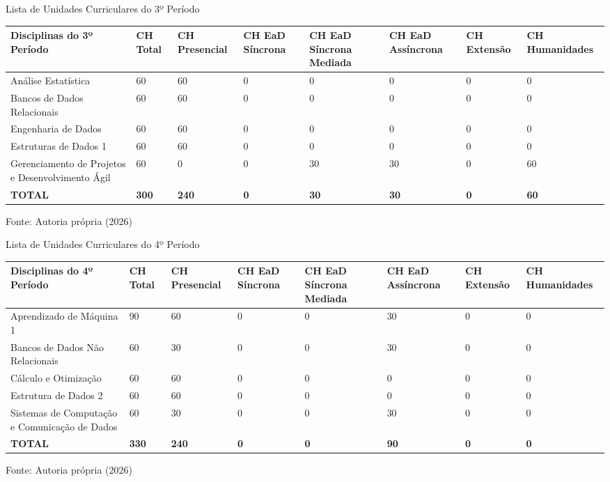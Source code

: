 \begin{quadro}[ht!]
\centering
\caption{Lista de Unidades Curriculares do 3º Período}
\label{quadro2.3}
\small
\begin{tabular}{|p{4.2cm}|p{1.2cm}|p{1.2cm}|p{1.2cm}|p{1.2cm}|p{1.2cm}|p{1.2cm}|p{1.2cm}|}
\hline
\rowcolor{gray!10} \textbf{Disciplinas do 3º Período} & \textbf{CH Total} & \textbf{CH Presencial} & \textbf{CH EaD Síncrona} & \textbf{CH EaD Síncrona Mediada} & \textbf{CH EaD Assíncrona} & \textbf{CH Extensão} & \textbf{CH Humanidades} \\ \hline
Análise Estatística & 60 & 60 & 0 & 0 & 0 & 0 & 0 \\ \hline
Bancos de Dados Relacionais & 60 & 60 & 0 & 0 & 0 & 0 & 0 \\ \hline
Engenharia de Dados & 60 & 60 & 0 & 0 & 0 & 0 & 0 \\ \hline
Estruturas de Dados 1 & 60 & 60 & 0 & 0 & 0 & 0 & 0 \\ \hline
Gerenciamento de Projetos e Desenvolvimento Ágil & 60 & 0 & 0 & 30 & 30 & 0 & 60 \\ \hline
\rowcolor{gray!20} \textbf{TOTAL} & \textbf{300} & \textbf{240} & \textbf{0} & \textbf{30} & \textbf{30} & \textbf{0} & \textbf{60} \\ \hline
\end{tabular}
\par\vspace{2pt}
\footnotesize{Fonte: Autoria própria (2026)}
\end{quadro}

\begin{quadro}[ht!]
\centering
\caption{Lista de Unidades Curriculares do 4º Período}
\label{quadro2.4}
\small
\begin{tabular}{|p{4.2cm}|p{1.2cm}|p{1.2cm}|p{1.2cm}|p{1.2cm}|p{1.2cm}|p{1.2cm}|p{1.2cm}|}
\hline
\rowcolor{gray!10} \textbf{Disciplinas do 4º Período} & \textbf{CH Total} & \textbf{CH Presencial} & \textbf{CH EaD Síncrona} & \textbf{CH EaD Síncrona Mediada} & \textbf{CH EaD Assíncrona} & \textbf{CH Extensão} & \textbf{CH Humanidades} \\ \hline
Aprendizado de Máquina 1 & 90 & 60 & 0 & 0 & 30 & 0 & 0 \\ \hline
Bancos de Dados Não Relacionais & 60 & 30 & 0 & 0 & 30 & 0 & 0 \\ \hline
Cálculo e Otimização & 60 & 60 & 0 & 0 & 0 & 0 & 0 \\ \hline
Estrutura de Dados 2 & 60 & 60 & 0 & 0 & 0 & 0 & 0 \\ \hline
Sistemas de Computação e Comunicação de Dados & 60 & 30 & 0 & 0 & 30 & 0 & 0 \\ \hline
\rowcolor{gray!20} \textbf{TOTAL} & \textbf{330} & \textbf{240} & \textbf{0} & \textbf{0} & \textbf{90} & \textbf{0} & \textbf{0} \\ \hline
\end{tabular}
\par\vspace{2pt}
\footnotesize{Fonte: Autoria própria (2026)}
\end{quadro}

